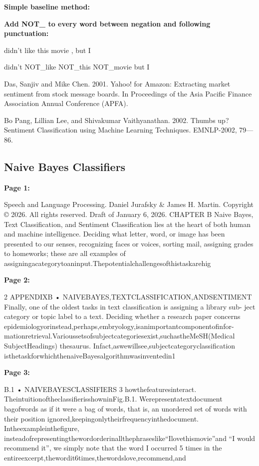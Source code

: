 \documentclass[11pt,a4paper]{article}
\begin{document}
\textbf{Simple baseline method:} 

\textbf{Add NOT\_ to every word between negation and following punctuation:} 

didn’t like this movie , but I

didn’t NOT\_like NOT\_this NOT\_movie but I

Das, Sanjiv and Mike Chen. 2001. Yahoo! for Amazon: Extracting market sentiment from stock message boards. In Proceedings of the Asia Pacific Finance Association Annual Conference (APFA).

Bo Pang, Lillian Lee, and Shivakumar Vaithyanathan.  2002.  Thumbs up? Sentiment Classification using Machine Learning Techniques. EMNLP-2002, 79—86.


\subsection{Naive Bayes Classifiers}

\textbf{Page 1:}

Speech and Language Processing. Daniel Jurafsky & James H. Martin. Copyright © 2026. All
rights reserved. Draft of January 6, 2026.
CHAPTER
B Naive Bayes, Text Classification,
and Sentiment
Classification lies at the heart of both human and machine intelligence. Deciding
what letter, word, or image has been presented to our senses, recognizing faces
or voices, sorting mail, assigning grades to homeworks; these are all examples of
assigningacategorytoaninput.Thepotentialchallengesofthistaskarehig

\textbf{Page 2:}

2 APPENDIXB • NAIVEBAYES,TEXTCLASSIFICATION,ANDSENTIMENT
Finally, one of the oldest tasks in text classification is assigning a library sub-
ject category or topic label to a text. Deciding whether a research paper concerns
epidemiologyorinstead,perhaps,embryology,isanimportantcomponentofinfor-
mationretrieval.Varioussetsofsubjectcategoriesexist,suchastheMeSH(Medical
SubjectHeadings) thesaurus. Infact,aswewillsee,subjectcategoryclassification
isthetaskforwhichthenaiveBayesalgorithmwasinventedin1

\textbf{Page 3:}

B.1 • NAIVEBAYESCLASSIFIERS 3
howthefeaturesinteract.
TheintuitionoftheclassifierisshowninFig.B.1. Werepresentatextdocument
bagofwords as if it were a bag of words, that is, an unordered set of words with their position
ignored,keepingonlytheirfrequencyinthedocument. Intheexampleinthefigure,
insteadofrepresentingthewordorderinallthephraseslike“Ilovethismovie”and
“I would recommend it”, we simply note that the word I occurred 5 times in the
entireexcerpt,thewordit6times,thewordslove,recommend,and
\end{document}
